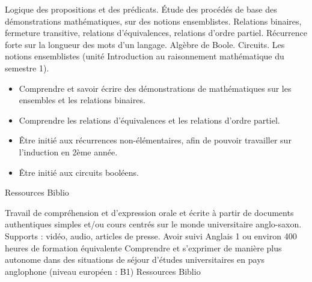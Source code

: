 \documentclass[10pt, a5paper]{report}
\begin{document}
\vfill


{Logique des propositions et des prédicats. \'Etude des procédés de base des démonstrations mathématiques, sur des notions ensemblistes. Relations binaires, fermeture transitive, relations d'équivalences, relations d'ordre partiel. Récurrence forte sur la longueur des mots d'un langage. Algèbre de Boole. Circuits.}
{Les notions ensemblistes (unité Introduction au raisonnement mathématique du semestre 1).}
{
\begin{itemize}
\item Comprendre et savoir écrire des démonstrations de mathématiques sur les ensembles et les relations binaires. 
\item Comprendre les relations d'équivalences et les relations d'ordre partiel.
\item Être initié aux récurrences non-élémentaires, afin de pouvoir travailler sur l'induction en 2ème année.
\item Être initié aux circuits booléens.
\end{itemize}
} 
{Ressources} 
{Biblio} 
 
\vfill


{Travail de compréhension et d'expression orale et écrite à partir de documents authentiques simples et/ou cours centrés sur le monde universitaire anglo-saxon. Supports : vidéo, audio, articles de presse.} 
{Avoir suivi Anglais 1 ou environ 400 heures de formation équivalente}
{Comprendre et s'exprimer de manière plus autonome dans des situations de séjour d'études universitaires en pays anglophone (niveau européen : B1)}
{Ressources} 
{Biblio} 
 
\end{document}
